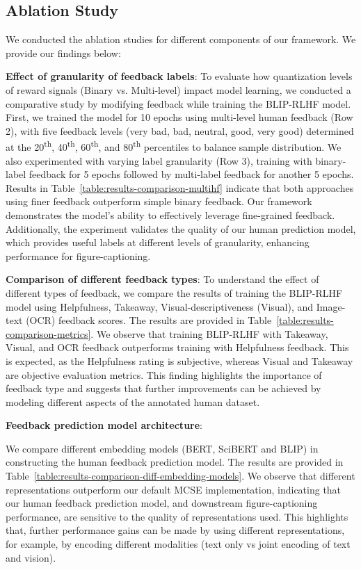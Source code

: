 \documentclass[11pt]{article}
\begin{document}
\subsection{Ablation Study} 
We conducted the ablation studies for different components of our framework. We provide our findings below:


\textbf{Effect of granularity of feedback labels}: 
 To evaluate how quantization levels of reward signals (Binary vs. Multi-level) impact model learning, we conducted a comparative study by modifying feedback while training the BLIP-RLHF model.
\\
First, we trained the model for 10 epochs using multi-level human feedback (Row 2), with five feedback levels (very bad, bad, neutral, good, very good) determined at the 20\textsuperscript{th}, 40\textsuperscript{th}, 60\textsuperscript{th}, and 80\textsuperscript{th} percentiles to balance sample distribution. We also experimented with varying label granularity (Row 3), training with binary-label feedback for 5 epochs followed by multi-label feedback for another 5 epochs.
Results in Table~\ref{table:results-comparison-multihf} indicate that both approaches using finer feedback outperform simple binary feedback. Our framework demonstrates the model’s ability to effectively leverage fine-grained feedback. Additionally, the experiment validates the quality of our human prediction model, which provides useful labels at different levels of granularity, enhancing performance for figure-captioning. 


\textbf{Comparison of different feedback types}:
To understand the effect of different types of feedback, we compare the results of training the BLIP-RLHF model using Helpfulness, Takeaway, Visual-descriptiveness (Visual), and Image-text (OCR) feedback scores. The results are provided in Table~\ref{table:results-comparison-metrics}.
We observe that training BLIP-RLHF with Takeaway, Visual, and OCR feedback outperforms training with Helpfulness feedback. This is expected, as the Helpfulness rating is subjective, whereas Visual and Takeaway are objective evaluation metrics. This finding highlights the importance of feedback type and suggests that further improvements can be achieved by modeling different aspects of the annotated human dataset.

\textbf{Feedback prediction model architecture}:

We compare different embedding models (BERT, SciBERT and BLIP) in constructing the human feedback prediction model. The results are provided in Table~\ref{table:results-comparison-diff-embedding-models}. 
We observe that different representations outperform our default MCSE implementation, indicating that our human feedback prediction model, and downstream figure-captioning performance, are sensitive to the quality of representations used. This highlights that, further performance gains can be made by using different representations, for example, by encoding different modalities (text only vs joint encoding of text and vision).
\end{document}
